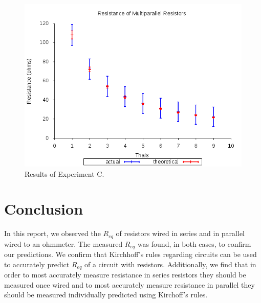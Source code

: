 \documentclass[aps,reprint,floatfix]{revtex4-1}
\begin{document}
\begin{figure}[h]
	\includegraphics[scale=.53]{resistor.png}
	\caption{Results of Experiment C.}
\end{figure}

\section{Conclusion}
In this report, we observed the $R_{eq}$ of resistors wired in series and in parallel wired to an ohmmeter. The measured $R_{eq}$ was found, in both cases, to confirm our predictions. We confirm that Kirchhoff's rules regarding circuits can be used to accurately predict $R_{eq}$ of a circuit with resistors. Additionally, we find that in order to most accurately measure resistance in series resistors they should be measured once wired and to most accurately measure resistance in parallel they should be measured individually predicted using Kirchoff's rules.
\end{document}
